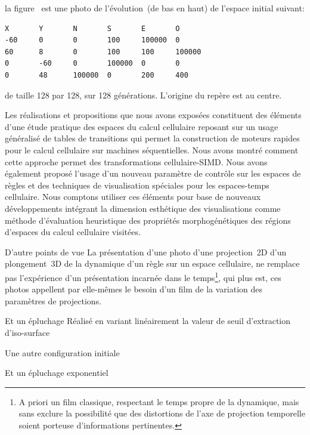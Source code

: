 la figure~ est une photo de l'évolution~(de bas en
haut) de l'espace initial suivant:

\footnotesize
\begin{verbatim}
X       Y       N       S       E       O
-60     0       0       100     100000  0
60      8       0       100     100     100000
0       -60     0       100000  0       0
0       48      100000  0       200     400
\end{verbatim}
\normalsize

de taille 128 par 128, sur 128 générations. %
L'origine du repère est au centre.

\vspace{4cm}
Les réalisations et propositions que nous avons exposées
constituent des éléments d'une étude pratique des espaces du calcul
cellulaire reposant sur un usage généralisé de tables de transitions
qui permet la construction de moteurs rapides pour le calcul
cellulaire sur machines séquentielles. %
Nous avons montré comment cette approche permet des transformations
cellulaire-SIMD. %
Nous avons également proposé l'usage d'un nouveau paramètre de contrôle
sur les espaces de règles et des techniques de visualisation
spéciales pour les espaces-temps cellulaire. %
Nous comptons utiliser ces éléments pour base de nouveaux
développements intégrant la dimension esthétique des visualisations
comme méthode d'évaluation heuristique des propriétés morphogénétiques
des régions d'espaces du calcul cellulaire visitées.

%
{}%
{D'autre points de vue}%
{La présentation d'une photo d'une projection~2D d'un plongement~3D de la
  dynamique d'un règle sur un espace cellulaire, ne remplace pas
  l'expérience d'un présentation incarnée dans le temps\footnote{%
    A priori un film classique, respectant le temps propre de la
    dynamique, mais sans exclure la possibilité que des distortions de
    l'axe de projection temporelle soient porteuse d'informations
    pertinentes.}, %
  qui plus est, ces photos appellent par elle-mêmes le besoin d'un
  film de la variation des paramètres de projections.}

%
{}%
{Et un épluchage}%
{Réalisé en variant linéairement la valeur de seuil d'extraction d'iso-sur\-face}

%
{}%
{Une autre configuration initiale}%
{}

%
{}%
{Et un épluchage exponentiel}%
{}

